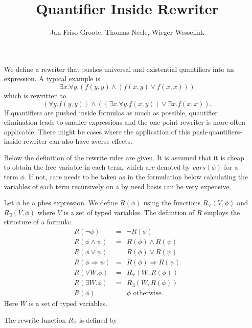 \documentclass{article}
\title{Quantifier Inside Rewriter}
\author{Jan Friso Groote, Thomas Neele, Wieger Wesselink}
\newcommand{\vars}{\mathit{vars}}
\begin{document}
\maketitle

We define a rewriter that pushes universal and existential quantifiers into an
expression. A typical example is
\[ \exists x.\forall y.(f(y,y)\wedge (f(x,y)\vee f(x,x))) \]
which is rewritten to
\[(\forall y.f(y,y)) \wedge ((\exists x.\forall y.f(x,y)) \vee \exists x.f(x,x)).\]
If quantifiers are pushed inside formulas as much as possible, quantifier elimination leads to smaller
expressions and the one-point rewriter is more often applicable. There might be cases where the
application of this push-quantifiers-inside-rewriter can also have averse effects.

Below the definition of the rewrite rules are given. It is assumed that it is cheap to obtain the
free variable in each term, which are denoted by $\vars(\phi)$ for a term $\phi$.
If not, care needs to be taken as in the formulation below calculating the
variables of each term recursively on a by need basis can be very expensive.

Let $\phi$ be a pbes expression. We
define $R(\phi)$ using the functions $R_{\forall}(V,\phi)$ and
$R_{\exists}(V,\phi)$ where $V$ is a set of typed variables. The
definition of $R$ employs the structure of a formula:
\begin{equation*}
\begin{array}{lll}
R(\neg \phi)&=&\neg R(\phi)\\
R(\phi\wedge \psi)&=&R(\phi)\wedge R(\psi)\\
R(\phi\vee\psi)&=&R(\phi)\vee R(\psi)\\
R(\phi\Rightarrow\psi)&=&R(\phi)\Rightarrow R(\psi)\\
R(\forall W.\phi)&=&R_{\forall}(W,R(\phi))\\
R(\exists W.\phi)&=&R_{\exists}(W,R(\phi))\\
R(\phi)&=&\phi\textrm{  otherwise}.
\end{array}
\end{equation*}
Here $W$ is a set of typed variables.

The rewrite function $R_{\forall}$ is defined by
\end{document}
